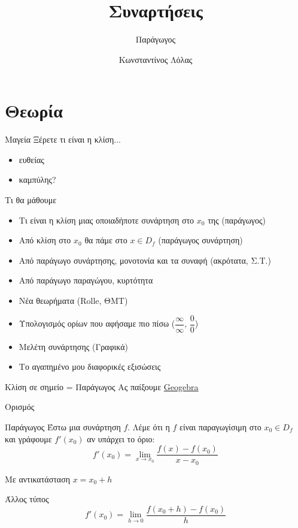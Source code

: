 \documentclass{presentation}
\title{Συναρτήσεις}
\subtitle{Παράγωγος}
\author[Λόλας]{Κωνσταντίνος Λόλας}
\begin{document}
\begin{frame}
  \titlepage
\end{frame}

\section{Θεωρία}
\begin{frame}{Μαγεία}
  Ξέρετε τι είναι η κλίση...
  \begin{itemize}
    \item<1-> ευθείας
    \item<2-> καμπύλης?
  \end{itemize}
\end{frame}

\begin{frame}{Τι θα μάθουμε}
  \begin{itemize}
    \item<1-> Τι είναι η κλίση μιας οποιαδήποτε συνάρτηση στο $x_0$ της (παράγωγος)
    \item<2-> Από κλίση στο $x_0$ θα πάμε στο $x\in D_f$ (παράγωγος συνάρτηση)
    \item<3-> Από παράγωγο συνάρτησης, μονοτονία και τα συναφή (ακρότατα, Σ.Τ.)
    \item<4-> Από παράγωγο παραγώγου, κυρτότητα
    \item<5-> Νέα θεωρήματα (Rolle, ΘΜΤ)
    \item<6-> Υπολογισμός ορίων που αφήσαμε πιο πίσω ($\dfrac{\infty}{\infty}$, $\dfrac{0}{0}$)
    \item<7-> Μελέτη συνάρτησης (Γραφικά)
    \item<8-> Το αγαπημένο μου  διαφορικές εξισώσεις
  \end{itemize}
\end{frame}

\begin{frame}{Κλίση σε σημείο = Παράγωγος}
  Ας παίξουμε
  \href{https://www.geogebra.org/m/v6g6qvfw}{Geogebra}
\end{frame}

\begin{frame}{Ορισμός}
  \begin{block}{Παράγωγος}
    Έστω μια συνάρτηση $f$. Λέμε ότι η $f$ είναι παραγωγίσιμη στο $x_0\in D_f$ και γράφουμε $f'(x_0)$ αν υπάρχει το όριο:
    $$f'(x_0)=\lim\limits_{x \to x_0}{ \frac{f(x)-f(x_0)}{x-x_0} }$$
  \end{block}

  Με αντικατάσταση $x=x_0+h$
  \begin{block}{Άλλος τύπος}
    $$f'(x_0)=\lim\limits_{h \to 0}{ \frac{f(x_0+h)-f(x_0)}{h} }$$
  \end{block}
\end{frame}
\end{document}
